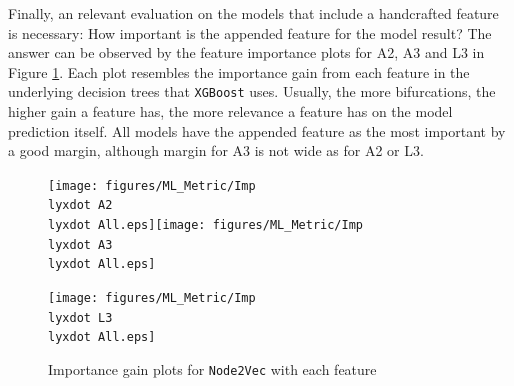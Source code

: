 Finally, an relevant evaluation on the models that include a handcrafted
feature is necessary: How important is the appended feature for the
model result? The answer can be observed by the feature importance
plots for A2, A3 and L3 in Figure \ref{F8-importance}. Each plot
resembles the importance gain from each feature in the underlying
decision trees that \texttt{XGBoost} uses. Usually, the more bifurcations,
the higher gain a feature has, the more relevance a feature has on
the model prediction itself. All models have the appended feature
as the most important by a good margin, although margin for A3 is
not wide as for A2 or L3.

\begin{figure}[h]
\noindent \begin{centering}
\caption{\label{F8-importance}Importance gain plots for \texttt{Node2Vec}
with each feature}
\par\end{centering}
\begin{centering}
\texttt{[image: figures/ML\_Metric/Imp\\lyxdot A2\\lyxdot All.eps]}\texttt{[image: figures/ML\_Metric/Imp\\lyxdot A3\\lyxdot All.eps]}
\par\end{centering}
\centering{}\texttt{[image: figures/ML\_Metric/Imp\\lyxdot L3\\lyxdot All.eps]}
\end{figure}
